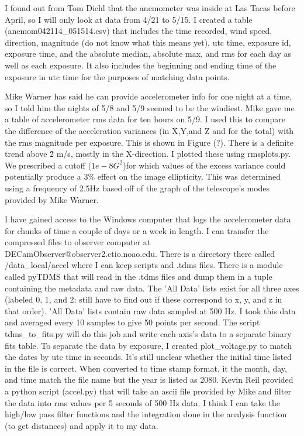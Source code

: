 \documentclass{article}
\begin{document}
I found out from Tom Diehl that the anemometer was inside at Las Tacas before April, so I will only look at data from 4/21 to 5/15. 
I created a table (anemom042114\_051514.csv) that includes the time recorded, wind speed, direction, magnitude (do not know what this means yet), utc time, exposure id, exposure time, and the absolute median, absolute max, and rms for each day as well as each exposure.
 It also includes the beginning and ending time of the exposure in utc time for the purposes of matching data points.

Mike Warner has said he can provide accelerometer info for one night at a time, so I told him the nights of 5/8 and 5/9 seemed to be the windiest. 
Mike gave me a table of accelerometer rms data for ten hours on 5/9. 
I used this to compare the difference of the acceleration variances (in X,Y,and Z and for the total) with the rms magnitude per exposure. 
This is shown in Figure (?). 
There is a definite trend above \~2 m/s, mostly in the X-direction. 
I plotted these using rmsplots.py. 
We prescribed a cutoff ($1e-8 G^{2}$)for which values of the excess variance could potentially produce a 3\% effect on the image ellipticity. 
This was determined using a frequency of 2.5Hz based off of the graph of the telescope's modes provided by Mike Warner.


I have gained access to the Windows computer that logs the accelerometer data for chunks of time a couple of days or a week in length. 
I can transfer the compressed files to observer computer at DECamObserver@observer2.ctio.noao.edu. 
There is a directory there called /data_local/accel where I can keep scripts and .tdms files. 
There is a module called pyTDMS that will read in the .tdms files and dump them in a tuple containing the metadata and raw data. 
The 'All Data' lists exist for all three axes (labeled 0, 1, and 2: still have to find out if these correspond to x, y, and z in that order).
'All Data' lists contain raw data sampled at 500 Hz. 
I took this data and averaged every 10 samples to give 50 points per second.
The script tdms_to_fits.py will do this job and write each axis's data to a separate binary fits table. 
To separate the data by exposure, I created plot_voltage.py to match the dates by utc time in seconds. 
It's still unclear whether the initial time listed in the file is correct.
When converted to time stamp format, it the month, day, and time match the file name but the year is listed as 2080. 
Kevin Reil provided a python script (accel.py) that will take an ascii file provided by Mike and filter the data into rms values per 5 seconds of 500 Hz data.
I think I can take the high/low pass filter functions and the integration done in the analysis function (to get distances) and apply it to my data. 
\end{document}
